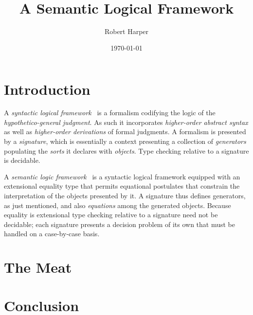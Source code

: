 \documentclass[11pt,twoside]{article}
\begin{document}
\title{A Semantic Logical Framework}
\author{Robert Harper}
\date{\today}

\maketitle{}

\section{Introduction}

A \emph{syntactic logical framework}~\citep{harper-etal:lf} is a formalism codifying the logic of the
\emph{hypothetico-general judgment}.  As such it incorporates \emph{higher-order abstract
  syntax} as well as \emph{higher-order derivations} of formal judgments.  A formalism is
presented by a \emph{signature}, which is essentially a context presenting a collection of
\emph{generators} populating the \emph{sorts} it declares with \emph{objects}.  Type
checking relative to a signature is decidable.

A \emph{semantic logic framework}~\citep{nordstrom-etal:mltt} is a syntactic logical
framework equipped with an extensional equality type that permits equational postulates
that constrain the interpretation of the objects presented by it.  A signature thus
defines generators, as just mentioned, and also \emph{equations} among the generated
objects.  Because equality is extensional type checking relative to a signature need not
be decidable; each signature presents a decision problem of its own that must be handled
on a case-by-case basis.

\section{The Meat}

\section{Conclusion}



\end{document}
